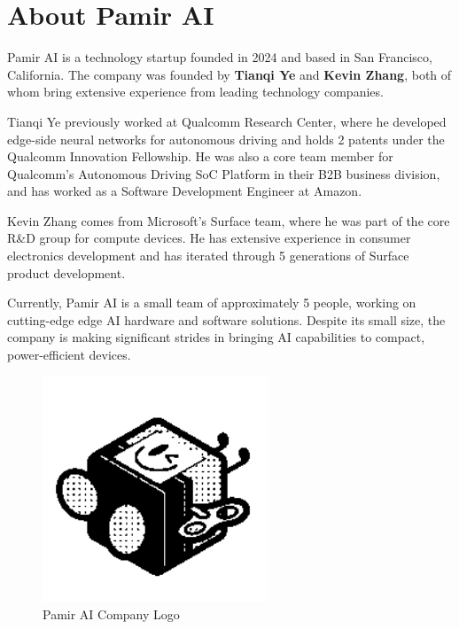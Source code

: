 \documentclass[12pt,a4paper]{report}
\begin{document}
\section{About Pamir AI}

Pamir AI is a technology startup founded in 2024 and based in San Francisco, California. The company was founded by \textbf{Tianqi Ye} and \textbf{Kevin Zhang}, both of whom bring extensive experience from leading technology companies.

\vspace{0.3cm}

Tianqi Ye previously worked at Qualcomm Research Center, where he developed edge-side neural networks for autonomous driving and holds 2 patents under the Qualcomm Innovation Fellowship. He was also a core team member for Qualcomm's Autonomous Driving SoC Platform in their B2B business division, and has worked as a Software Development Engineer at Amazon.

\vspace{0.3cm}

Kevin Zhang comes from Microsoft's Surface team, where he was part of the core R\&D group for compute devices. He has extensive experience in consumer electronics development and has iterated through 5 generations of Surface product development.

\vspace{0.3cm}

Currently, Pamir AI is a small team of approximately 5 people, working on cutting-edge edge AI hardware and software solutions. Despite its small size, the company is making significant strides in bringing AI capabilities to compact, power-efficient devices.

\begin{figure}[h]
    \centering
    \includegraphics[width=0.6\textwidth]{pamirai_logo.png}
    \caption{Pamir AI Company Logo}
\end{figure}
\end{document}

